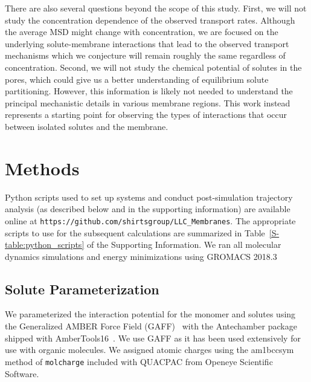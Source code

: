 \documentclass[journal=jpcbfk,manuscript=article]{achemso}
\begin{document}
  There are also 
  several questions beyond
  the scope of this study.
  First, we will not study the concentration dependence of the observed transport
  rates. Although the average MSD might change with concentration, we are 
  focused on the underlying solute-membrane interactions that lead to the 
  observed transport mechanisms which we conjecture will remain roughly
  the same regardless of concentration. Second, we will not study the chemical potential
  of solutes in the pores, which could give us a better understanding of 
  equilibrium solute partitioning. However, this information is 
  likely
  not needed
  to understand the 
  principal
  mechanistic details in various membrane regions. 
  This work 
  instead
  represents a starting point for observing the types of interactions
  that occur between isolated solutes and the membrane.

  \section{Methods}
  
  Python scripts used to set up systems and conduct post-simulation trajectory 
  analysis 
  (as described below and in the supporting information) are available online at \texttt{https://github.com/shirtsgroup/LLC\_Membranes}. 
  The appropriate scripts to use for the subsequent calculations are summarized in 
  Table~\ref{S-table:python_scripts} of the Supporting Information.
  We ran all molecular dynamics simulations and energy minimizations using GROMACS 2018.3 \cite{bekker_gromacs:_1993,berendsen_gromacs:_1995,van_der_spoel_gromacs:_2005,hess_gromacs_2008} 
  
  \subsection{Solute Parameterization}\label{method:parameterization}
  
  We parameterized the interaction potential for the monomer and solutes using 
  the Generalized AMBER Force Field (GAFF)~\cite{wang_development_2004} with the
  Antechamber package \cite{wang_automatic_2006} shipped with AmberTools16~\cite{case_ambertools16_2016}.
  We use GAFF as it has been used extensively for use with organic molecules.
  We assigned atomic charges using the am1bccsym method of \texttt{molcharge} included
  with QUACPAC from Openeye Scientific Software.
  
\end{document}
